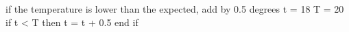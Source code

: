if the temperature is lower than the expected, add by 0.5 degrees
t = 18
T = 20
if t < T then
  t = t + 0.5
end if
